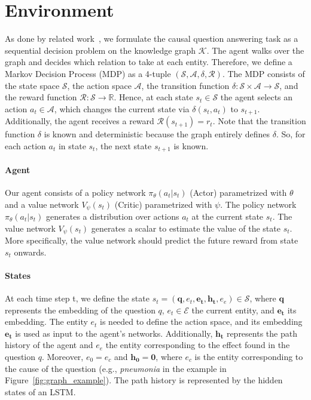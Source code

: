 \section{Environment}
\label{sec:env}
As done by related work~\cite{Xiong2017DeePpath, Das2018Minerva, Qiu2020Stepwise}, we formulate the causal question answering task as a sequential decision
problem on the knowledge graph $\mathcal{K}$. The agent walks over the graph and decides which
relation to take at each entity. Therefore, we define a Markov Decision Process (MDP) as a 4-tuple 
$(\mathcal{S}, \mathcal{A}, \delta, \mathcal{R})$. The MDP consists of the state space $\mathcal{S}$,
 the action space $\mathcal{A}$, the transition function $\delta : \mathcal{S} \times 
 \mathcal{A} \rightarrow \mathcal{S}$, and the reward function 
 $\mathcal{R} : \mathcal{S} \rightarrow \mathbb{R}$. Hence, at each state $s_t \in \mathcal{S}$ the agent selects
 an action $a_t \in \mathcal{A}$, which changes the current state via $\delta(s_t, a_t)$ to 
 $s_{t+1}$. Additionally, the agent receives a reward $\mathcal{R}(s_{t+1}) = r_t$.
 Note that the transition function $\delta$ is known and deterministic because the graph entirely defines $\delta$.
 So, for each action $a_t$ in state $s_t$, the
 next state $s_{t+1}$ is known.

 \paragraph{Agent} Our agent consists of a policy network $\pi_{\theta} (a_t | s_t)$ (Actor)
 parametrized with $\theta$ and a value network $V_{\psi}(s_t)$ (Critic) parametrized with $\psi$. The policy network $\pi_{\theta} (a_t | s_t)$ generates
 a distribution over actions $a_t$ at the current state $s_t$. The value network
$V_{\psi}(s_t)$ generates a scalar to estimate the value of the state $s_t$.
More specifically, the value network should predict the future reward from state $s_t$ onwards.

\paragraph{States} At each time step t, we define the state $s_t = (\mathbf{q}, e_t, \mathbf{e_t}, \mathbf{h_t}, e_e) \in \mathcal{S}$,
where $\mathbf{q}$ represents the embedding of the question $q$, $e_t \in \mathcal{E}$ the current entity, and $\mathbf{e_t}$ its embedding. 
The entity $e_t$ is needed to define the action space, and its embedding $\mathbf{e_t}$ is used as input to the agent's networks.
Additionally, $\mathbf{h_t}$ represents the path history of the agent and $e_e$ the entity corresponding to the effect found in the question $q$.
Moreover, $e_0 = e_c$ and $\mathbf{h_0} = \mathbf{0}$, where $e_c$ is the entity 
corresponding to the cause of the question (e.g., \textit{pneumonia} in the example in 
Figure~\ref{fig:graph_example}). The path history is represented by the hidden states of an
LSTM. 

